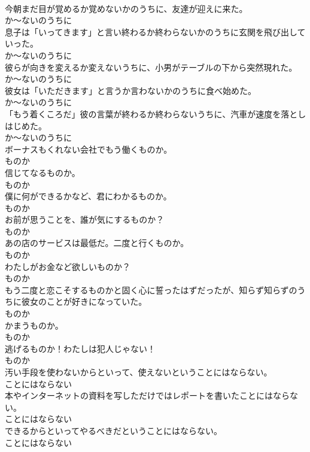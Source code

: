 \documentclass[8pt]{extreport}
\begin{document}
\begin{CJK}{UTF8}{min}
\\	今朝まだ目が覚めるか覚めないかのうちに、友達が迎えに来た。	
\\	か～ないのうちに	
\\	息子は「いってきます」と言い終わるか終わらないかのうちに玄関を飛び出していった。	
\\	か～ないのうちに	
\\	彼らが向きを変えるか変えないうちに、小男がテーブルの下から突然現れた。	
\\	か～ないのうちに	
\\	彼女は「いただきます」と言うか言わないかのうちに食べ始めた。	
\\	か～ないのうちに	
\\	「もう着くころだ」彼の言葉が終わるか終わらないうちに、汽車が速度を落としはじめた。	
\\	か～ないのうちに	
\\	ボーナスもくれない会社でもう働くものか。	
\\	ものか	
\\	信じてなるものか。	
\\	ものか	
\\	僕に何ができるかなど、君にわかるものか。	
\\	ものか	
\\	お前が思うことを、誰が気にするものか？	
\\	ものか	
\\	あの店のサービスは最低だ。二度と行くものか。	
\\	ものか	
\\	わたしがお金など欲しいものか？	
\\	ものか	
\\	もう二度と恋こそするものかと固く心に誓ったはずだったが、知らず知らずのうちに彼女のことが好きになっていた。	
\\	ものか	
\\	かまうものか。	
\\	ものか	
\\	逃げるものか！わたしは犯人じゃない！	
\\	ものか	
\\	汚い手段を使わないからといって、使えないということにはならない。	
\\	ことにはならない	
\\	本やインターネットの資料を写しただけではレポートを書いたことにはならない。	
\\	ことにはならない	
\\	できるからといってやるべきだということにはならない。	
\\	ことにはならない	

\end{CJK}
\end{document}
